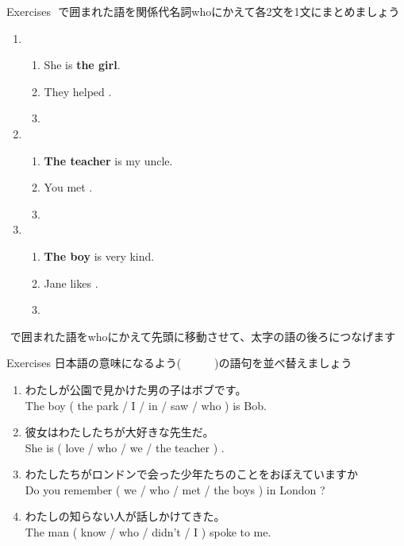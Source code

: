 \documentclass[aspectratio=169,xcolor={dvipsnames,table}]{beamer}
\begin{document}
\begin{frame}[plain]{Exercises}
\fbox{　　}\,\,で囲まれた語を関係代名詞whoにかえて各2文を1文にまとめましょう
\begin{enumerate}
 \item \begin{enumerate}
	\item She is {\bfseries the girl}.
	\item They helped .
	\item {}
       \end{enumerate}
 \item \begin{enumerate}
	\item {\bfseries The teacher} is my uncle.
	\item You met .
	\item {}
       \end{enumerate}
 \item \begin{enumerate}
	\item {\bfseries The boy} is very kind.
	\item Jane likes .
	\item {}
       \end{enumerate}
\end{enumerate} 

\hfill\fbox{　　}\,\,で囲まれた語をwhoにかえて先頭に移動させて、太字の語の後ろにつなげます
\end{frame}
\begin{frame}[plain]{Exercises}
日本語の意味になるよう(~~~~~~)の語句を並べ替えましょう
\begin{enumerate}
 \item わたしが公園で見かけた男の子はボブです。\\
       The boy ( the park / I / in / saw / who ) is Bob.\\
 \item 彼女はわたしたちが大好きな先生だ。\\
       She is ( love / who / we / the teacher ) .\\
 \item わたしたちがロンドンで会った少年たちのことをおぼえていますか\\
       Do you remember ( we / who / met / the boys ) in London ?\\
 \item わたしの知らない人が話しかけてきた。\\
       The man ( know / who / didn't / I ) spoke to me.\\
\end{enumerate}
\end{frame}
\end{document}
